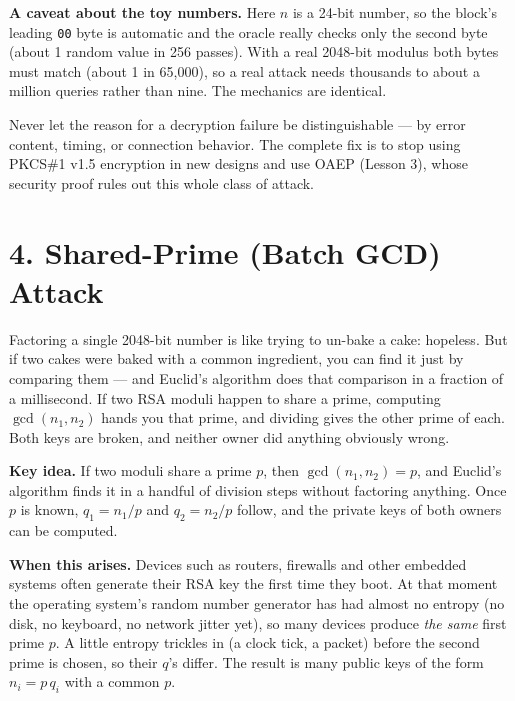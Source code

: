 \documentclass[11pt]{article}
\begin{document}
\textbf{A caveat about the toy numbers.} Here $n$ is a 24-bit number, so the block's leading \texttt{00} byte is automatic and the oracle really checks only the second byte (about 1 random value in 256 passes). With a real 2048-bit modulus both bytes must match (about 1 in 65{,}000), so a real attack needs thousands to about a million queries rather than nine. The mechanics are identical.

\begin{fixbox}
Never let the reason for a decryption failure be distinguishable --- by error content, timing, or connection behavior. The complete fix is to stop using PKCS\#1 v1.5 encryption in new designs and use OAEP (Lesson 3), whose security proof rules out this whole class of attack.
\end{fixbox}

\hrulefill

\section*{4. Shared-Prime (Batch GCD) Attack}

\begin{intuition}
Factoring a single 2048-bit number is like trying to un-bake a cake: hopeless. But if two cakes were baked with a common ingredient, you can find it just by comparing them --- and Euclid's algorithm does that comparison in a fraction of a millisecond. If two RSA moduli happen to share a prime, computing $\gcd(n_1,n_2)$ hands you that prime, and dividing gives the other prime of each. Both keys are broken, and neither owner did anything obviously wrong.
\end{intuition}

\textbf{Key idea.} If two moduli share a prime $p$, then $\gcd(n_1,n_2)=p$, and Euclid's algorithm finds it in a handful of division steps without factoring anything. Once $p$ is known, $q_1=n_1/p$ and $q_2=n_2/p$ follow, and the private keys of both owners can be computed.

\textbf{When this arises.} Devices such as routers, firewalls and other embedded systems often generate their RSA key the first time they boot. At that moment the operating system's random number generator has had almost no entropy (no disk, no keyboard, no network jitter yet), so many devices produce \emph{the same} first prime $p$. A little entropy trickles in (a clock tick, a packet) before the second prime is chosen, so their $q$'s differ. The result is many public keys of the form $n_i=p\,q_i$ with a common $p$.
\end{document}
